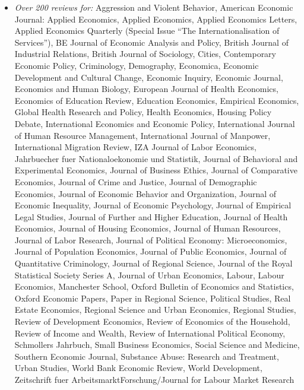 \documentclass[10pt,pdftex,a4paper,oneside]{article}
\begin{document}
\begin{itemize}[noitemsep,nolistsep]
\item[] \emph{Over 200 reviews for:} Aggression and Violent Behavior, American Economic Journal: Applied Economics, Applied Economics, Applied Economics Letters, Applied Economics Quarterly (Special Issue ``The Internationalisation of Services''), BE Journal of Economic Analysis and Policy, British Journal of Industrial Relations, British Journal of Sociology, Cities, Contemporary Economic Policy,  Criminology, Demography, Economica, Economic Development and Cultural Change, Economic Inquiry, Economic Journal, Economics and Human Biology, European Journal of Health Economics, Economics of Education Review, Education Economics, Empirical Economics, Global Health Research and Policy, Health Economics, Housing Policy Debate, International Economics and Economic Policy, International Journal of Human Resource Management, International Journal of Manpower, International Migration Review, IZA Journal of Labor Economics, Jahrbuecher fuer Nationaloekonomie und Statistik,  Journal of Behavioral and Experimental Economics, Journal of Business Ethics, Journal of Comparative Economics, Journal of Crime and Justice, Journal of Demographic Economics, Journal of Economic Behavior and Organization, Journal of Economic Inequality, Journal of Economic Psychology, Journal of Empirical Legal Studies, Journal of Further and Higher Education, Journal of Health Economics, Journal of Housing Economics, Journal of Human Resources, Journal of Labor Research, Journal of Political Economy: Microeconomics, Journal of Population Economics, Journal of Public Economics, Journal of Quantitative Criminology, Journal of Regional Science, Journal of the Royal Statistical Society Series A, Journal of Urban Economics, Labour, Labour Economics, Manchester School, Oxford Bulletin of Economics and Statistics, Oxford Economic Papers, Paper in Regional Science, Political Studies, Real Estate Economics, Regional Science and Urban Economics, Regional Studies, Review of Development Economics, Review of Economics of the Household, Review of Income and Wealth, Review of International Political Economy, Schmollers Jahrbuch, Small Business Economics, Social Science and Medicine, Southern Economic Journal, Substance Abuse: Research and Treatment, Urban Studies, World Bank Economic Review, World Development, Zeitschrift fuer ArbeitsmarktForschung/Journal for Labour Market Research
\end{itemize}
\end{document}
